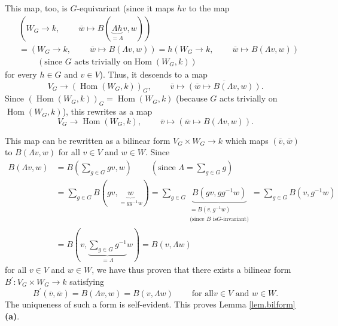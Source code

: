 \documentclass
[numbers=enddot,12pt,final,onecolumn,german,notitlepage]{scrartcl}%
\theoremstyle{definition}
\begin{document}
This map, too, is $G$-equivariant (since it maps $hv$ to the map%
\begin{align*}
&  \left(  W_{G}\rightarrow k,\ \ \ \ \ \ \ \ \ \ \overline{w}\mapsto B\left(
\underbrace{\Lambda h}_{=\Lambda}v,w\right)  \right) \\
&  =\left(  W_{G}\rightarrow k,\ \ \ \ \ \ \ \ \ \ \overline{w}\mapsto
B\left(  \Lambda v,w\right)  \right)  =h\left(  W_{G}\rightarrow
k,\ \ \ \ \ \ \ \ \ \ \overline{w}\mapsto B\left(  \Lambda v,w\right)  \right)
\\
&  \ \ \ \ \ \ \ \ \ \ \left(  \text{since }G\text{ acts trivially on
}\operatorname*{Hom}\left(  W_{G},k\right)  \right)
\end{align*}
for every $h\in G$ and $v\in V$). Thus, it descends to a map%
\[
V_{G}\rightarrow\left(  \operatorname*{Hom}\left(  W_{G},k\right)  \right)
_{G},\ \ \ \ \ \ \ \ \ \ \overline{v}\mapsto\overline{\left(  \overline
{w}\mapsto B\left(  \Lambda v,w\right)  \right)  }.
\]
Since $\left(  \operatorname*{Hom}\left(  W_{G},k\right)  \right)
_{G}=\operatorname*{Hom}\left(  W_{G},k\right)  $ (because $G$ acts trivially
on $\operatorname*{Hom}\left(  W_{G},k\right)  $), this rewrites as a map%
\[
V_{G}\rightarrow\operatorname*{Hom}\left(  W_{G},k\right)
,\ \ \ \ \ \ \ \ \ \ \overline{v}\mapsto\left(  \overline{w}\mapsto B\left(
\Lambda v,w\right)  \right)  .
\]


This map can be rewritten as a bilinear form $V_{G}\times W_{G}\rightarrow k$
which maps $\left(  \overline{v},\overline{w}\right)  $ to $B\left(  \Lambda
v,w\right)  $ for all $v\in V$ and $w\in W$. Since
\begin{align*}
B\left(  \Lambda v,w\right)   &  =B\left(  \sum\limits_{g\in G}gv,w\right)
\ \ \ \ \ \ \ \ \ \ \left(  \text{since }\Lambda=\sum\limits_{g\in G}g\right)
\\
&  =\sum\limits_{g\in G}B\left(  gv,\underbrace{w}_{=gg^{-1}w}\right)
=\sum\limits_{g\in G}\underbrace{B\left(  gv,gg^{-1}w\right)  }%
_{\substack{=B\left(  v,g^{-1}w\right)  \\\text{(since }B\text{ is
}G\text{-invariant)}}}=\sum\limits_{g\in G}B\left(  v,g^{-1}w\right) \\
&  =B\left(  v,\underbrace{\sum\limits_{g\in G}g^{-1}}_{=\Lambda}w\right)
=B\left(  v,\Lambda w\right)
\end{align*}
for all $v\in V$ and $w\in W$, we have thus proven that there exists a
bilinear form $B^{\prime}:V_{G}\times W_{G}\rightarrow k$ satisfying%
\[
B^{\prime}\left(  \overline{v},\overline{w}\right)  =B\left(  \Lambda
v,w\right)  =B\left(  v,\Lambda w\right)  \ \ \ \ \ \ \ \ \ \ \text{for all
}v\in V\text{ and }w\in W\text{.}%
\]
The uniqueness of such a form is self-evident. This proves Lemma
\ref{lem.bilform} \textbf{(a)}.
\end{document}
